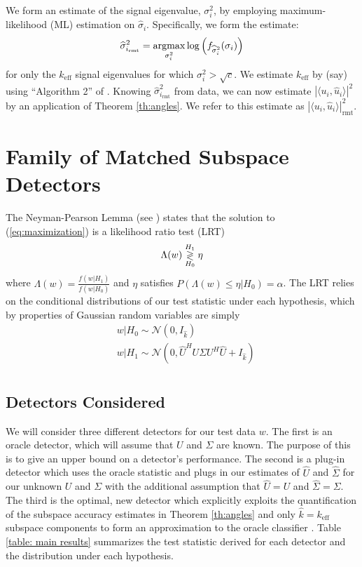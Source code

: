 We form an estimate of the signal eigenvalue, $\sigma_{i}^{2}$, by employing maximum-likelihood (ML) estimation on $\widehat{\sigma}_i$. Specifically, we form the estimate:
\begin{equation}\label{eq:cov}
\widehat{\sigma}^2_{i_\text{rmt}} = \argmax_{\sigma_i^2} \log\left(f_{\widehat{\sigma}_i^2}(\sigma_i)\right)
\end{equation}
for only the $k_\text{eff}$ signal eigenvalues for which $\sigma_i^2 > \sqrt{c}$.  We estimate $k_\text{eff}$ by (say) using ``Algorithm 2'' of  \cite{nadakuditi2010fundamental}.  Knowing $\widehat{\sigma}^2_{i_\text{rmt}}$ from data, we can now estimate $|\langle u_i,\widehat{u}_i\rangle|^2$ by an application of Theorem \ref{th:angles}. We refer to this estimate as $|\langle u_i,\widehat{u}_i\rangle|^2_{\text{rmt}}$.

\section{Family of Matched Subspace Detectors}\label{sec:detectors}

The Neyman-Pearson Lemma (see \cite{van1968detection}) states that the solution to (\ref{eq:maximization}) is a likelihood ratio test (LRT)
\begin{equation*}
\Lambda(w) \overset{H_1}{\underset{H_0}{\gtrless}} \eta
\end{equation*}
where $\Lambda(w) = \frac{f(w|H_1)}{f(w|H_0)}$ and $\eta$ satisfies $P(\Lambda(w)\leq\eta|H_0)=\alpha$. The LRT relies on the conditional distributions of our test statistic under each hypothesis, which by properties of Gaussian random variables are simply
\begin{equation*}
\begin{aligned}
&w|H_0\sim\mathcal{N}(0,I_{\widehat{k}})\\
&w|H_1\sim\mathcal{N}(0, \widehat{U}^HU\Sigma U^H\widehat{U} +I_{\widehat{k}})\\
\end{aligned}
\end{equation*}

\subsection{Detectors Considered}\label{sec:main results}

We will consider three different detectors for our test data $w$. The first is an oracle detector, which will assume that $U$ and $\Sigma$ are known. The purpose of this is to give an upper bound on a detector's performance. The second is a plug-in detector which uses the oracle statistic and plugs in our estimates of $\widehat{U}$  and $\widehat{\Sigma}$ for our unknown $U$ and $\Sigma$ with the additional assumption that $\widehat{U} = U$ and $\widehat{\Sigma} = \Sigma$. The third is the optimal, new detector which explicitly exploits the quantification of the subspace accuracy estimates in Theorem \ref{th:angles} and only $\widehat{k} = k_\text{eff}$ subspace components to form an approximation to the oracle classifier . Table \ref{table: main results} summarizes the test statistic derived for each detector and the distribution under each hypothesis.

